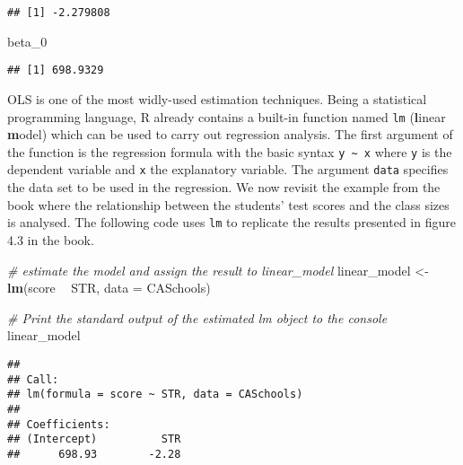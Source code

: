 \documentclass[]{book}
\newenvironment{Shaded}{\begin{snugshade}}{\end{snugshade}}
\newcommand{\KeywordTok}[1]{\textcolor[rgb]{0.13,0.29,0.53}{\textbf{#1}}}
\newcommand{\DataTypeTok}[1]{\textcolor[rgb]{0.13,0.29,0.53}{#1}}
\newcommand{\DecValTok}[1]{\textcolor[rgb]{0.00,0.00,0.81}{#1}}
\newcommand{\StringTok}[1]{\textcolor[rgb]{0.31,0.60,0.02}{#1}}
\newcommand{\CommentTok}[1]{\textcolor[rgb]{0.56,0.35,0.01}{\textit{#1}}}
\newcommand{\OperatorTok}[1]{\textcolor[rgb]{0.81,0.36,0.00}{\textbf{#1}}}
\newcommand{\NormalTok}[1]{#1}
\theoremstyle{definition}
\theoremstyle{definition}
\theoremstyle{definition}
\theoremstyle{remark}
\begin{document}
\begin{verbatim}
## [1] -2.279808
\end{verbatim}

\begin{Shaded}
\begin{Highlighting}[]
\NormalTok{beta_}\DecValTok{0}
\end{Highlighting}
\end{Shaded}

\begin{verbatim}
## [1] 698.9329
\end{verbatim}

OLS is one of the most widly-used estimation techniques. Being a
statistical programming language, R already contains a built-in function
named \texttt{lm} (\textbf{l}inear \textbf{m}odel) which can be used to
carry out regression analysis. The first argument of the function is the
regression formula with the basic syntax
\texttt{y\ \textasciitilde{}\ x} where \texttt{y} is the dependent
variable and \texttt{x} the explanatory variable. The argument
\texttt{data} specifies the data set to be used in the regression. We
now revisit the example from the book where the relationship between the
students' test scores and the class sizes is analysed. The following
code uses \texttt{lm} to replicate the results presented in figure 4.3
in the book.

\begin{Shaded}
\begin{Highlighting}[]
\CommentTok{# estimate the model and assign the result to linear_model}
\NormalTok{linear_model <-}\StringTok{ }\KeywordTok{lm}\NormalTok{(score }\OperatorTok{~}\StringTok{ }\NormalTok{STR, }\DataTypeTok{data =}\NormalTok{ CASchools)}

\CommentTok{# Print the standard output of the estimated lm object to the console }
\NormalTok{linear_model}
\end{Highlighting}
\end{Shaded}

\begin{verbatim}
## 
## Call:
## lm(formula = score ~ STR, data = CASchools)
## 
## Coefficients:
## (Intercept)          STR  
##      698.93        -2.28
\end{verbatim}
\end{document}
